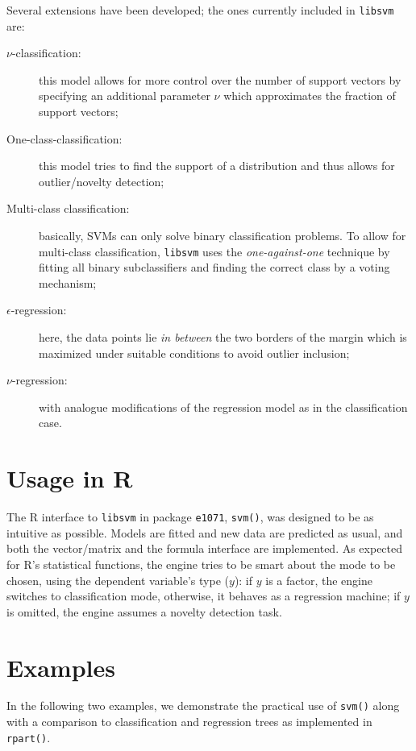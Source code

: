 \documentclass[a4paper]{article}
\newcommand{\pkg}[1]{\texttt{#1}}
\begin{document}
Several extensions have been developed; the ones currently
included in \texttt{libsvm} are:

\begin{description}
 \item[$\nu$-classification:] this model allows for more control over
  the number of support vectors
  \cite[see][]{svm:scholkopf+smola+williamson:2000} by specifying an
  additional parameter $\nu$ which approximates the fraction of
  support vectors;
 \item[One-class-classification:] this model tries to find the support of a
  distribution and thus allows for outlier/novelty detection;
 \item[Multi-class classification:] basically, SVMs can only solve
  binary classification problems. To allow for multi-class
  classification, \texttt{libsvm} uses the
  \textit{one-against-one} technique by fitting all binary
  subclassifiers and finding the correct class by a voting mechanism;
 \item[$\epsilon$-regression:] here, the data points lie
  \textit{in between} the two borders of the margin which is maximized under
  suitable conditions to avoid outlier inclusion;
 \item[$\nu$-regression:] with analogue modifications of the regression
  model as in the classification case.
\end{description}

\section*{Usage in R}

The R interface to \texttt{libsvm} in package \pkg{e1071}, \texttt{svm()},
was designed to be as intuitive as possible. Models are fitted
and new data are predicted as usual, and both the vector/matrix and the
formula interface are implemented. As expected for R's statistical
functions, the engine tries to be smart about
the mode to be chosen, using the dependent variable's type ($y$):
if $y$ is a factor, the engine switches to
classification mode, otherwise, it behaves as a regression
machine; if $y$ is omitted, the engine assumes a novelty detection task.

\section*{Examples}

In the following two examples, we demonstrate the practical use of
\texttt{svm()} along with a comparison to classification and
regression trees as implemented in \texttt{rpart()}.
\end{document}
